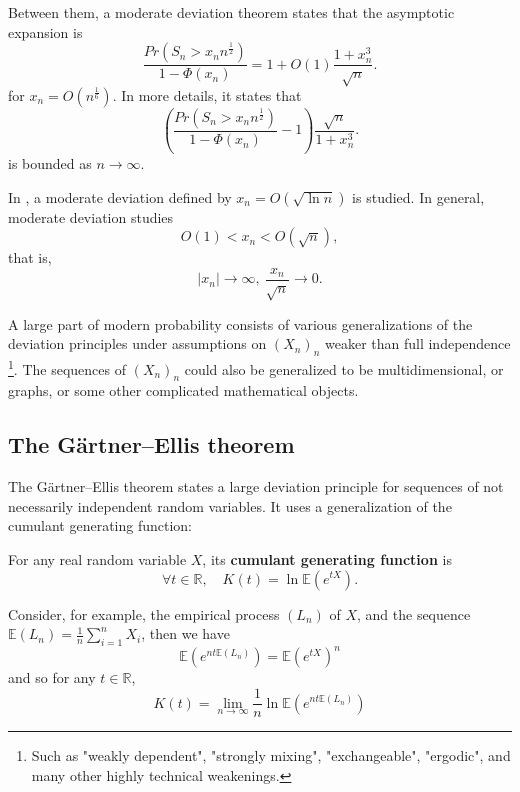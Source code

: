 Between them, a moderate deviation theorem \cite{chenSteinIdentitiesModerate2013} states that the asymptotic expansion is
\begin{equation}
	\frac {Pr(S_n > x_n n^{\frac 1 2})}  {1 - \Phi(x_n)} = 1 + O(1) \frac{1 + x^3_n}{\sqrt{n}}.
\end{equation}
for $x_n = O(n^{\frac 1 6})$. In more details, it states that 
\begin{equation}
	\left(\frac {Pr(S_n > x_n n^{\frac 1 2})}  {1 - \Phi(x_n)} - 1\right) \frac{\sqrt{n}}{1 + x^3_n}.
\end{equation}
is bounded as $n\to\infty$.

In \cite{rubinProbabilitiesModerateDeviations1965}, a moderate deviation defined by $x_n = O(\sqrt{\ln{n}})$ is studied. In general, moderate deviation studies 
$$O(1) < x_n < O(\sqrt{n}),$$
that is, 
\begin{equation}
|x_n| \to \infty, \: \frac{x_n}{\sqrt{n}} \to 0.
\end{equation}

A large part of modern probability consists of various generalizations of the deviation principles under assumptions on $(X_n)_n$ weaker than full independence
\footnote{Such as "weakly dependent", "strongly mixing", "exchangeable", "ergodic", and many other highly technical weakenings.}. The sequences of $(X_n)_n$ could also be generalized to be multidimensional, or graphs, or some other complicated mathematical objects.

\subsection{The G\"artner--Ellis theorem}
The G\"artner--Ellis theorem states a large deviation principle for sequences of not necessarily independent random variables. It uses a generalization of the cumulant generating function:

\begin{defn}
For any real random variable $X$, its \textbf{cumulant generating function} is
\begin{equation}
\forall t\in \mathbb{R}, \quad K(t) = \ln\mathbb{E}(e^{tX}).
\end{equation}
\end{defn}


Consider, for example, the empirical process $(L_n)$ of $X$, and the sequence $\mathbb{E}(L_n) = \frac 1 n \sum_{i=1}^n X_i$, then we have 
$${\mathbb{{{E}}}}{\left({e}^{{{n}{t}{\mathbb{{{E}}}}{\left({L}_{{n}}\right)}}}\right)} = {\mathbb{{{E}}}}{\left({e}^{{{t}{X}}}\right)}^{n}
$$
and so for any $t\in\mathbb{R}$,
$$K(t) = \lim_{n\to \infty}\frac 1 n \ln {\mathbb{{{E}}}}{\left({e}^{{{n}{t}{\mathbb{{{E}}}}{\left({L}_{{n}}\right)}}}\right)}$$


